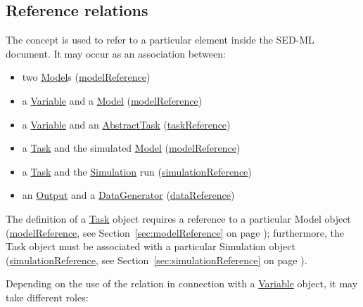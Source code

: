 \subsection{Reference relations}
\label{sec:reference}

The  concept is used to refer to a particular element inside the SED-ML document. It may occur as an association between:

\begin{itemize}
	\item{two \hyperref[class:model]{Model}s (\hyperref[sec:modelReference]{modelReference})}
	\item{a \hyperref[class:variable]{Variable} and a \hyperref[class:model]{Model} (\hyperref[sec:modelReference]{modelReference})}
	\item{a \hyperref[class:variable]{Variable} and an \hyperref[class:abstractTask]{AbstractTask} (\hyperref[sec:taskReference]{taskReference})}
	\item{a \hyperref[class:task]{Task} and the simulated \hyperref[class:model]{Model} (\hyperref[sec:modelReference]{modelReference})}
	\item{a \hyperref[class:task]{Task} and the \hyperref[class:simulation]{Simulation} run (\hyperref[sec:simulationReference]{simulationReference})}
	\item{an \hyperref[class:output]{Output} and a \hyperref[class:dataGenerator]{DataGenerator} (\hyperref[sec:dataReference]{dataReference})}
\end{itemize}

The definition of a \hyperref[class:task]{Task} object requires a reference to a particular Model object (\hyperref[sec:modelReference]{modelReference}, see Section~\ref{sec:modelReference} on page \pageref{sec:modelReference}); furthermore, the Task object must be associated with a particular Simulation object (\hyperref[sec:simulationReference]{simulationReference}, see Section~\ref{sec:simulationReference} on page \pageref{sec:simulationReference}).

Depending on the use of the  relation in connection with a \hyperref[class:variable]{Variable} object, it may take different roles: 

